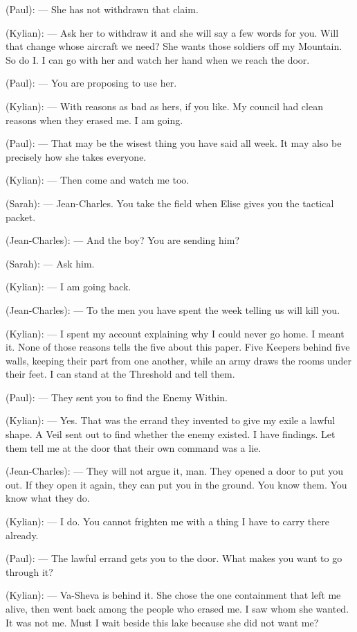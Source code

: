 \begin{room}
(Paul): --- She has not withdrawn that claim.

(Kylian): --- Ask her to withdraw it and she will say a few words for you. Will that change whose aircraft we need? She wants those soldiers off my Mountain. So do I. I can go with her and watch her hand when we reach the door.

(Paul): --- You are proposing to use her.

(Kylian): --- With reasons as bad as hers, if you like. My council had clean reasons when they erased me. I am going.

(Paul): --- That may be the wisest thing you have said all week. It may also be precisely how she takes everyone.

(Kylian): --- Then come and watch me too.

(Sarah): --- Jean-Charles. You take the field when Elise gives you the tactical packet.

(Jean-Charles): --- And the boy? You are sending him?

(Sarah): --- Ask him.

(Kylian): --- I am going back.

(Jean-Charles): --- To the men you have spent the week telling us will kill you.

(Kylian): --- I spent my account explaining why I could never go home. I meant it. None of those reasons tells the five about this paper. Five Keepers behind five walls, keeping their part from one another, while an army draws the rooms under their feet. I can stand at the Threshold and tell them.

(Paul): --- They sent you to find the Enemy Within.

(Kylian): --- Yes. That was the errand they invented to give my exile a lawful shape. A Veil sent out to find whether the enemy existed. I have findings. Let them tell me at the door that their own command was a lie.

(Jean-Charles): --- They will not argue it, man. They opened a door to put you out. If they open it again, they can put you in the ground. You know them. You know what they do.

(Kylian): --- I do. You cannot frighten me with a thing I have to carry there already.

(Paul): --- The lawful errand gets you to the door. What makes you want to go through it?

\centerline{}

(Kylian): --- Va-Sheva is behind it. She chose the one containment that left me alive, then went back among the people who erased me. I saw whom she wanted. It was not me. Must I wait beside this lake because she did not want me?


\end{room}
